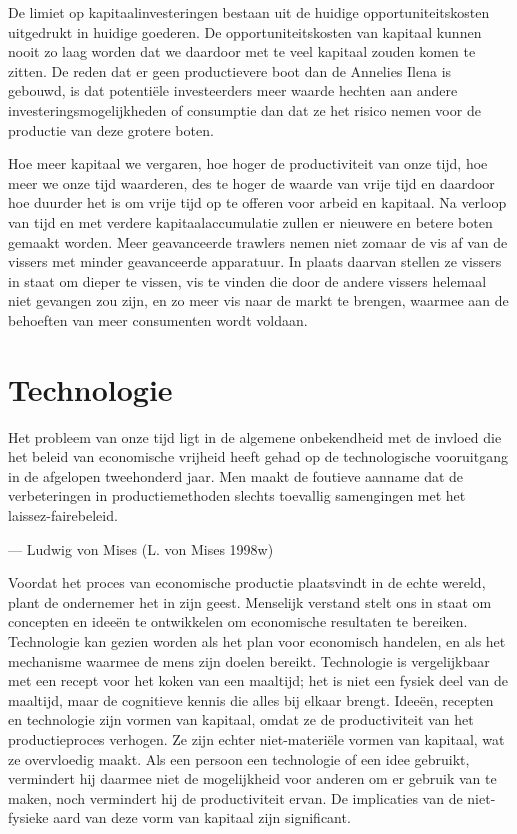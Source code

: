 \documentclass[
  a5paper,
  smalldemyvopaper,11pt,twoside,onecolumn,openright,extrafontsizes,
hidelinks]{memoir}
\begin{document}
De limiet op kapitaalinvesteringen bestaan uit de huidige
opportuniteitskosten uitgedrukt in huidige goederen. De
opportuniteitskosten van kapitaal kunnen nooit zo laag worden dat we
daardoor met te veel kapitaal zouden komen te zitten. De reden dat er
geen productievere boot dan de Annelies Ilena is gebouwd, is dat
potentiële investeerders meer waarde hechten aan andere
investeringsmogelijkheden of consumptie dan dat ze het risico nemen voor
de productie van deze grotere boten.

Hoe meer kapitaal we vergaren, hoe hoger de productiviteit van onze
tijd, hoe meer we onze tijd waarderen, des te hoger de waarde van vrije
tijd en daardoor hoe duurder het is om vrije tijd op te offeren voor
arbeid en kapitaal. Na verloop van tijd en met verdere
kapitaalaccumulatie zullen er nieuwere en betere boten gemaakt worden.
Meer geavanceerde trawlers nemen niet zomaar de vis af van de vissers
met minder geavanceerde apparatuur. In plaats daarvan stellen ze vissers
in staat om dieper te vissen, vis te vinden die door de andere vissers
helemaal niet gevangen zou zijn, en zo meer vis naar de markt te
brengen, waarmee aan de behoeften van meer consumenten wordt voldaan.

\chapter{Technologie}\label{sec-technologie}

Het probleem van onze tijd ligt in de algemene onbekendheid met de
invloed die het beleid van economische vrijheid heeft gehad op de
technologische vooruitgang in de afgelopen tweehonderd jaar. Men maakt
de foutieve aanname dat de verbeteringen in productiemethoden slechts
toevallig samengingen met het laissez-fairebeleid.

--- Ludwig von Mises (L. von Mises 1998w)

Voordat het proces van economische productie plaatsvindt in de echte
wereld, plant de ondernemer het in zijn geest. Menselijk verstand stelt
ons in staat om concepten en ideeën te ontwikkelen om economische
resultaten te bereiken. Technologie kan gezien worden als het plan voor
economisch handelen, en als het mechanisme waarmee de mens zijn doelen
bereikt. Technologie is vergelijkbaar met een recept voor het koken van
een maaltijd; het is niet een fysiek deel van de maaltijd, maar de
cognitieve kennis die alles bij elkaar brengt. Ideeën, recepten en
technologie zijn vormen van kapitaal, omdat ze de productiviteit van het
productieproces verhogen. Ze zijn echter niet-materiële vormen van
kapitaal, wat ze overvloedig maakt. Als een persoon een technologie of
een idee gebruikt, vermindert hij daarmee niet de mogelijkheid voor
anderen om er gebruik van te maken, noch vermindert hij de
productiviteit ervan. De implicaties van de niet-fysieke aard van deze
vorm van kapitaal zijn significant.
\end{document}
